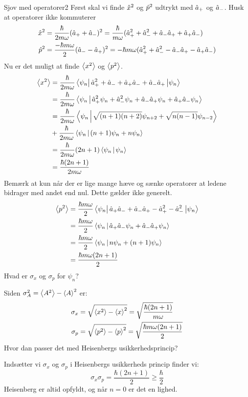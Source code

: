 \begin{opgave}{Sjov med operatorer}{2}
Først skal vi finde $\hat x^2$ og $\hat p^2$ udtrykt med $\hat a_+$ og $\hat a_-$. Husk at operatorer ikke kommuterer
\begin{align*}
\hat x^2 &= \frac{\hbar}{2m\omega}(\hat a_++\hat a_-)^2 = \frac{\hbar}{m\omega}(\hat a_+^2+\hat a_-^2+\hat a_-\hat a_++\hat a_+\hat a_-)\\
\hat p^2 &= \frac{-\hbar m\omega}{2} (\hat a_--\hat a_+)^2 = -\hbar m \omega (\hat a_+^2+\hat a_-^2-\hat a_-\hat a_+-\hat a_+\hat a_-)
\end{align*}
Nu er det muligt at finde $\left< x^2 \right>$ og $\left< p^2 \right>$.
\begin{align*}
    \expect{x^2} &= \frac{\hbar}{2m\omega}\matrixel{\psi_n}{\op a_+^2+\op a_-+\op a_+\op a_-+\op a_-\op a_+}{\psi_n}\\
    &= \frac{\hbar}{2m\omega}\braket{\psi_n}{\op a_+^2\psi_n+\op a_-^2\psi_n+\op a_-\op a_+\psi_n+\op a_+\op a_-\psi_n}\\
    &= \frac{\hbar}{2m\omega}\braket{\psi_n}{\sqrt{(n+1)(n+2)}\psi_{n+2}+\sqrt{n(n-1)}\psi_{n-2}}\\
    &+ \frac{\hbar}{2m\omega}\braket{\psi_n}{(n+1)\psi_n+n\psi_{n}}\\
    &= \frac{\hbar}{2m\omega}(2n+1)\braket{\psi_n}{\psi_n}\\
    &= \frac{\hbar(2n+1)}{2m\omega}
\end{align*}
Bemærk at kun når der er lige mange hæve og sænke operatorer at ledene bidrager med andet end nul. Dette gælder ikke generelt.
\begin{align*}
    \expect{p^2} &= \frac{\hbar m\omega}{2} \matrixel{\psi_n}{\op a_+\op a_-+\op a_-\op a_+-\op a_+^2-\op a_-^2}{\psi_n}\\
    &= \frac{\hbar m\omega}{2} \braket{\psi_n}{\op a_+\op a_-\psi_n+\op a_-\op a_+\psi_n}\\
    &= \frac{\hbar m\omega}{2} \braket{\psi_n}{n\psi_n+(n+1)\psi_n}\\
    &= \frac{\hbar m\omega (2n+1)}{2}
\end{align*}
\opg Hvad er $\sigma_x$ og $\sigma_p$ for $\psi_n$?

Siden $\sigma_A^2 = \left< A^2 \right>-\left< A \right>^2$ er:
\begin{align*}
    \sigma_x &= \sqrt{\left< x^2 \right>-\left< x \right>^2} = \sqrt{\frac{\hbar (2n+1)}{m\omega}}\\
    \sigma_p &= \sqrt{\left< p^2 \right>-\left< p \right>^2} = \sqrt{\frac{\hbar m\omega (2n+1)}{2}}
\end{align*}
\opg Hvor dan passer det med Heisenbergs usikkerhedsprincip?

Indsætter vi $\sigma_x$ og $\sigma_p$ i Heisenbergs usikkerheds princip finder vi:
$$
\sigma_x\sigma_p = \frac{\hbar(2n+1)}{2}\geq \frac{\hbar}{2}
$$
Heisenberg er altid opfyldt, og når $n=0$ er det en lighed.
\end{opgave}

